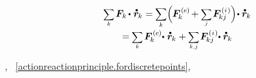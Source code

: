 \begin{multline}
\scalebox{.8}{$ \displaystyle \sum_{\smash{k}} $} \hspace{.3ex}
\bm{F}_k \hspace{-0.2ex} \dotp \hspace{.1ex} \mathdotabove{\locationvector}_{\hspace{-0.1ex}k}
= \hspace{-0.1ex}
\scalebox{.85}[.9]{$ \displaystyle \sum_{\smash{k}} $}
\Bigl( \hspace{-0.1ex} \bm{F}^{\smthexternal}_{\hspace{-0.16ex}k} \hspace{-0.1ex}
+ \scalebox{.8}{$ \displaystyle \underset{\raisemath{.25ex}{\smash{j}}}{\sum} $} \hspace{.2ex} \bm{F}^{\smthinternal}_{\hspace{-0.16ex}kj}
\hspace{.1ex} \Bigr) \hspace{-0.4ex} \dotp \mathdotabove{\locationvector}_{\hspace{-0.1ex}k}
\\
%
= \hspace{-0.1ex}
\scalebox{.8}{$ \displaystyle \sum_{\smash{k}} $} \hspace{.3ex}
\bm{F}^{\smthexternal}_{\hspace{-0.16ex}k} \hspace{-0.4ex} \dotp \hspace{.1ex} \mathdotabove{\locationvector}_{\hspace{-0.1ex}k}
+ \scalebox{.8}{$ \displaystyle \sum_{\smash{k,\hspace{.1ex}j}} $} %
\hspace{.2ex} \bm{F}^{\smthinternal}_{\hspace{-0.16ex}kj} \hspace{-0.4ex} \dotp \mathdotabove{\locationvector}_{\hspace{-0.1ex}k}
\end{multline}

\vspace{-0.3em}\noindent
{},
~\eqref{actionreactionprinciple.fordiscretepoints},


